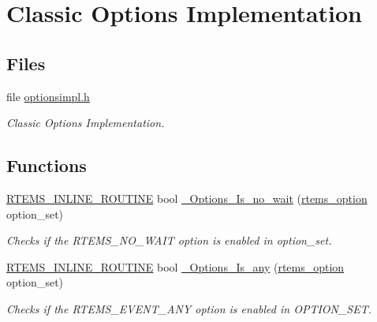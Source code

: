 \hypertarget{group__ClassicOptionsImpl}{}\section{Classic Options Implementation}
\label{group__ClassicOptionsImpl}
\subsection*{Files}
\begin{DoxyCompactItemize}
\item 
file \mbox{\hyperlink{optionsimpl_8h}{optionsimpl.\+h}}
\begin{DoxyCompactList}\small\item\em Classic Options Implementation. \end{DoxyCompactList}\end{DoxyCompactItemize}
\subsection*{Functions}
\begin{DoxyCompactItemize}
\item 
\mbox{\hyperlink{group__RTEMSScoreBaseDefs_gac216239df231d5dbd15e3520b0b9313f}{R\+T\+E\+M\+S\+\_\+\+I\+N\+L\+I\+N\+E\+\_\+\+R\+O\+U\+T\+I\+NE}} bool \mbox{\hyperlink{group__ClassicOptionsImpl_gad7266fa291de08576f76366360c86f0a}{\+\_\+\+Options\+\_\+\+Is\+\_\+no\+\_\+wait}} (\mbox{\hyperlink{group__ClassicOptions_gad26685eb0e60a9650082935c31920e29}{rtems\+\_\+option}} option\+\_\+set)
\begin{DoxyCompactList}\small\item\em Checks if the R\+T\+E\+M\+S\+\_\+\+N\+O\+\_\+\+W\+A\+IT option is enabled in option\+\_\+set. \end{DoxyCompactList}\item 
\mbox{\hyperlink{group__RTEMSScoreBaseDefs_gac216239df231d5dbd15e3520b0b9313f}{R\+T\+E\+M\+S\+\_\+\+I\+N\+L\+I\+N\+E\+\_\+\+R\+O\+U\+T\+I\+NE}} bool \mbox{\hyperlink{group__ClassicOptionsImpl_gacd5bef15cf9d6ecb38b4904496d56147}{\+\_\+\+Options\+\_\+\+Is\+\_\+any}} (\mbox{\hyperlink{group__ClassicOptions_gad26685eb0e60a9650082935c31920e29}{rtems\+\_\+option}} option\+\_\+set)
\begin{DoxyCompactList}\small\item\em Checks if the R\+T\+E\+M\+S\+\_\+\+E\+V\+E\+N\+T\+\_\+\+A\+NY option is enabled in O\+P\+T\+I\+O\+N\+\_\+\+S\+ET. \end{DoxyCompactList}\end{DoxyCompactItemize}


